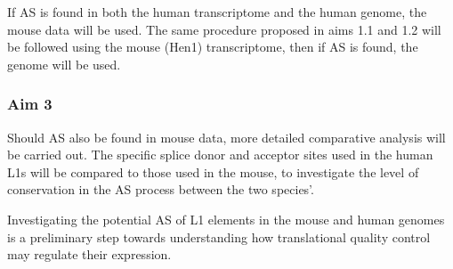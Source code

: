 \documentclass[12pt]{article}
\begin{document}
			If AS is found in both the human transcriptome and the human genome, the mouse data will be used.
			The same procedure proposed in aims 1.1 and 1.2 will be followed using the mouse (Hen1) transcriptome, then if AS is found, the genome will be used.
			
		\subsubsection*{Aim 3}
		
			Should AS also be found in mouse data, more detailed comparative analysis will be carried out. 
			The specific splice donor and acceptor sites used in the human L1s will be compared to those used in the mouse, to investigate the level of conservation in the AS process between the two species'.
			 
		
			Investigating the potential AS of L1 elements in the mouse and human genomes is a preliminary step towards understanding how translational quality control may regulate their expression.
		
%		 



		
\end{document}
